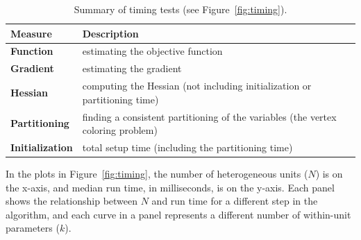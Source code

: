 \documentclass[jss]{jss}\usepackage[]{graphicx}\usepackage[]{color}
\begin{document}
\begin{table}[ptb]\centering
  \begin{tabularx}{1.0\linewidth}{>{\bfseries}l X}
    \toprule
    Measure&Description\\
    \midrule
Function&estimating the objective function\\
Gradient&estimating the gradient\\
Hessian&computing the Hessian (not including initialization or
  partitioning time)\\
Partitioning&finding a consistent partitioning of the
  variables (the vertex coloring problem)\\
Initialization&total setup time (including the partitioning time)\\
    \bottomrule
  \end{tabularx}
  \caption{Summary of timing tests (see Figure~\ref{fig:timing}).}\label{tab:timeMeasures}
\end{table}

In the plots in Figure~\ref{fig:timing}, the number of heterogeneous units ($N$) is
on the x-axis, and median run time, in milliseconds, is on the y-axis.  Each panel shows the
relationship between $N$ and run time for a different step in the algorithm,
and each curve in a panel represents a different number of within-unit
parameters ($k$).
\end{document}

